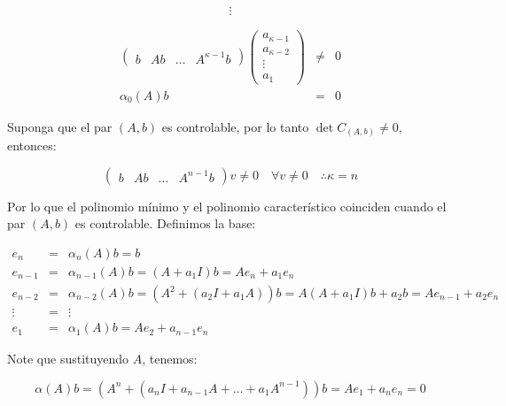        \begin{equation}
            \vdots \nonumber
        \end{equation}

        \begin{eqnarray}
        \begin{pmatrix}
        b & Ab & \dots & A^{\kappa - 1} b
        \end{pmatrix}
        \begin{pmatrix}
        a_{\kappa - 1} \\
        a_{\kappa - 2} \\
        \vdots \\
        a_{1}
        \end{pmatrix} & \ne & 0 \nonumber \\
        \alpha_0(A) b & = & 0 \nonumber
        \end{eqnarray}

        Suponga que el par $(A,b)$ es controlable, por lo tanto $\det{C_{(A,b)}} \ne 0$, entonces:

        \begin{equation}
            \begin{pmatrix}
            b & A b & \dots & A^{n-1} b
            \end{pmatrix} v \ne 0 \quad \forall v \ne 0 \quad \therefore \kappa = n
        \end{equation}

        Por lo que el polinomio mínimo y el polinomio característico coinciden cuando el par $(A,b)$ es controlable. Definimos la base:

        \begin{eqnarray}
        e_n & = & \alpha_n(A) b = b \nonumber \\
        e_{n-1} & = & \alpha_{n-1}(A) b = (A + a_1I) b = A e_n + a_1 e_n \nonumber \\
        e_{n-2} & = & \alpha_{n-2}(A) b = (A^2 + (a_2I + a_1A)) b = A(A+a_1I) b + a_2 b = A e_{n-1} + a_2 e_n \nonumber \\
        \vdots & = & \vdots \nonumber \\
        e_1 & = & \alpha_1(A) b = A e_2 + a_{n-1} e_n
        \end{eqnarray}

        Note que sustituyendo $A$, tenemos:

        \begin{equation}
            \alpha(A) b = (A^n + (a_nI + a_{n-1}A + \dots + a_1 A^{n-1})) b = A e_1 + a_n e_n = 0
        \end{equation}

